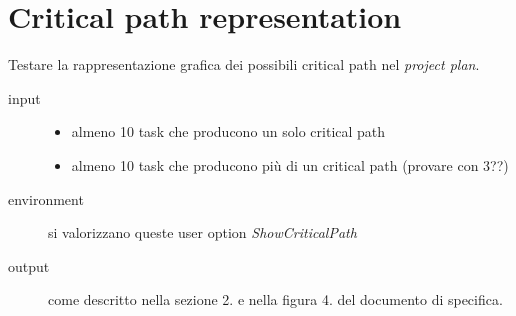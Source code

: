 \section{Critical path representation}
Testare la rappresentazione grafica dei possibili critical path
nel \emph{project plan}.
\begin{description}
\item[input]  \quad
\begin{itemize}
  \item almeno 10 task che producono un solo critical path
  \item almeno 10 task che producono pi\`u di un critical path (provare con 3??)
\end{itemize}
\item[environment] si valorizzano queste user option
\emph{ShowCriticalPath}
\item[output] come descritto nella sezione 2. e nella figura 4. del
documento di specifica.
\end{description}

